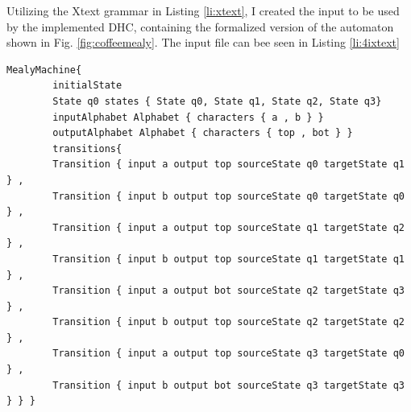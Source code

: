 Utilizing the Xtext grammar in Listing \ref{li:xtext}, I created the input to be used by the implemented DHC, containing the formalized version of the automaton shown in Fig. \ref{fig:coffeemealy}. The input file can bee seen in Listing \ref{li:4ixtext}


\begin{lstlisting}[caption=The Mealy machine seen in Fig.\ref{fig:dfaexamplemealyver}.a in the form of the Xtext grammar described in Listing \ref{li:xtext}.,label=li:4ixtext]
	MealyMachine{
		initialState 
		State q0 states { State q0, State q1, State q2, State q3}
		inputAlphabet Alphabet { characters { a , b } }
		outputAlphabet Alphabet { characters { top , bot } }
		transitions{ 
		Transition { input a output top sourceState q0 targetState q1 } , 
		Transition { input b output top sourceState q0 targetState q0 } , 
		Transition { input a output top sourceState q1 targetState q2 } , 
		Transition { input b output top sourceState q1 targetState q1 } , 
		Transition { input a output bot sourceState q2 targetState q3 } , 
		Transition { input b output top sourceState q2 targetState q2 } , 
		Transition { input a output top sourceState q3 targetState q0 } , 
		Transition { input b output bot sourceState q3 targetState q3 } } }
\end{lstlisting}